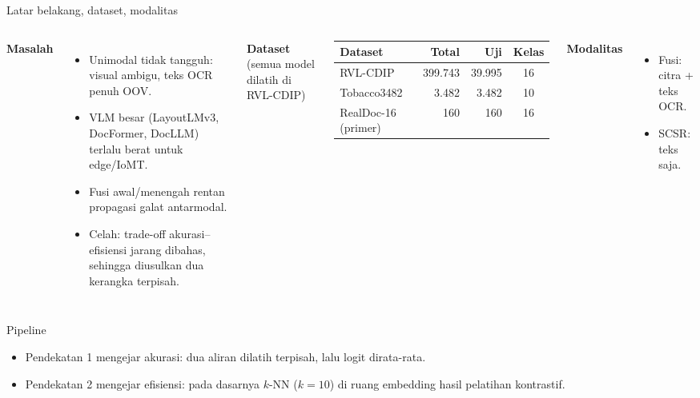 \documentclass[aspectratio=169,10pt]{beamer}
\newcommand\kecil{\fontsize{8}{9.5}\selectfont}
\begin{document}
\begin{frame}{Latar belakang, dataset, modalitas}
  \begin{columns}[T]
    \textbf{Masalah}
    \begin{itemize}\kecil
      \item Unimodal tidak tangguh: visual ambigu, teks OCR penuh OOV.
      \item VLM besar (LayoutLMv3, DocFormer, DocLLM) terlalu berat untuk edge/IoMT.
      \item Fusi awal/menengah rentan propagasi galat antarmodal.
      \item Celah: trade-off akurasi--efisiensi jarang dibahas, sehingga diusulkan \alert{dua kerangka} terpisah.
    \end{itemize}
    \textbf{Dataset} (semua model dilatih di RVL-CDIP)\\[2pt]
    {\kecil\begin{tabular}{lrrc}
      \toprule Dataset & Total & Uji & Kelas \\ \midrule
      RVL-CDIP & 399.743 & 39.995 & 16 \\
      Tobacco3482 & 3.482 & 3.482 & 10 \\
      RealDoc-16 (primer) & 160 & 160 & 16 \\ \bottomrule
    \end{tabular}}
    \vspace{4pt}
    \textbf{Modalitas}
    \begin{itemize}\kecil
      \item Fusi: citra + teks OCR.
      \item SCSR: teks saja.
    \end{itemize}
  \end{columns}
\end{frame}

\begin{frame}{Pipeline}
  \centering
  \begin{minipage}{0.85\linewidth}\end{minipage}
  \begin{itemize}\kecil
    \item Pendekatan 1 mengejar akurasi: dua aliran dilatih terpisah, lalu logit dirata-rata.
    \item Pendekatan 2 mengejar efisiensi: pada dasarnya $k$-NN ($k=10$) di ruang embedding hasil pelatihan kontrastif.
  \end{itemize}
\end{frame}
\end{document}
